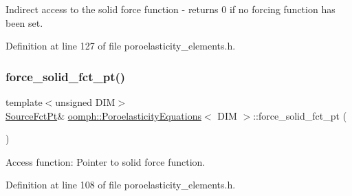 Indirect access to the solid force function -\/ returns 0 if no forcing function has been set. 



Definition at line 127 of file poroelasticity\+\_\+elements.\+h.

\mbox{\label{classoomph_1_1PoroelasticityEquations_ae59c6343b07892f04c9005bdebd9a222}} 
\subsubsection{\texorpdfstring{force\+\_\+solid\+\_\+fct\+\_\+pt()}{force\_solid\_fct\_pt()}\hspace{0.1cm}{\footnotesize\ttfamily [1/2]}}
{\footnotesize\ttfamily template$<$unsigned D\+IM$>$ \\
\hyperlink{classoomph_1_1PoroelasticityEquations_a234bc29fbd4c3255ef903a3cb5f6361f}{Source\+Fct\+Pt}\& \hyperlink{classoomph_1_1PoroelasticityEquations}{oomph\+::\+Poroelasticity\+Equations}$<$ D\+IM $>$\+::force\+\_\+solid\+\_\+fct\+\_\+pt (\begin{DoxyParamCaption}{ }\end{DoxyParamCaption})\hspace{0.3cm}{\ttfamily [inline]}}



Access function\+: Pointer to solid force function. 



Definition at line 108 of file poroelasticity\+\_\+elements.\+h.

\mbox{\label{classoomph_1_1PoroelasticityEquations_ae86831a8828e73c666585ac2dcf56456}} 
